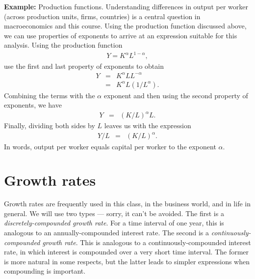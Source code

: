 \textbf{Example:} Production functions.
Understanding differences  in output per worker (across production units, firms, countries) is a central question in macroeconomics and this course. Using the production function discussed above, we can use properties of exponents to arrive at an expression suitable for this analysis. Using the production function
\begin{eqnarray*}
    Y = K^{\alpha} L^{1-\alpha},
\end{eqnarray*}
use the first and last property of exponents to obtain
\begin{eqnarray*}
    Y &=& K^{\alpha} L L^{-\alpha} \\
      &=& K^{\alpha} L ({1}/{L^{\alpha}}).
\end{eqnarray*}
Combining the terms with the $\alpha$ exponent and then using the second property of exponents, we have
\begin{eqnarray*}
     Y &=& \left( {K}/{L} \right)^{\alpha} L.
\end{eqnarray*}
Finally, dividing both sides by $L$ leaves us with the expression
\begin{eqnarray*}
     {Y}/{L} &=& \left( {K}/{L} \right)^{\alpha}.
\end{eqnarray*}
In words, output per worker equals capital per worker to the exponent $\alpha$.

\section{Growth rates}
\label{sec:growth_math}

Growth rates
 are frequently used in this class, in the business world, and in life in general.
We will use two types --- sorry, it can't be avoided.
The first is a \emph{discretely-compounded growth rate}.
For a time interval of one year, this is analogous to an annually-compounded interest rate.
The second is a {\it continuously-compounded   growth rate\/}.
This is analogous to a continuously-compounded   interest rate,
in which interest is compounded over a very short time interval.
The former is more natural in some respects,
but the latter leads to simpler expressions when compounding is important.

